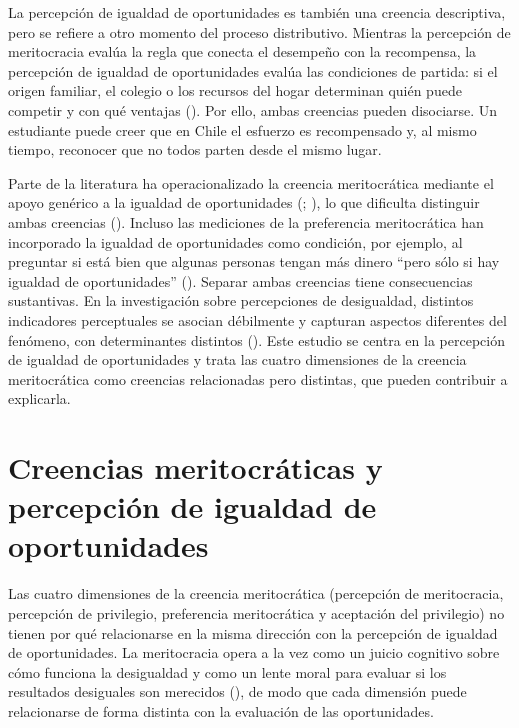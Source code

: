 \documentclass[
  spanish,
  a4paper,
  oneside]{scrbook}
\begin{document}
La percepción de igualdad de oportunidades es también una creencia
descriptiva, pero se refiere a otro momento del proceso distributivo.
Mientras la percepción de meritocracia evalúa la regla que conecta el
desempeño con la recompensa, la percepción de igualdad de oportunidades
evalúa las condiciones de partida: si el origen familiar, el colegio o
los recursos del hogar determinan quién puede competir y con qué
ventajas (). Por ello, ambas
creencias pueden disociarse. Un estudiante puede creer que en Chile el
esfuerzo es recompensado y, al mismo tiempo, reconocer que no todos
parten desde el mismo lugar.

Parte de la literatura ha operacionalizado la creencia meritocrática
mediante el apoyo genérico a la igualdad de oportunidades
(;
), lo que dificulta
distinguir ambas creencias (). Incluso las mediciones de la preferencia meritocrática
han incorporado la igualdad de oportunidades como condición, por
ejemplo, al preguntar si está bien que algunas personas tengan más
dinero ``pero sólo si hay igualdad de oportunidades''
().
Separar ambas creencias tiene consecuencias sustantivas. En la
investigación sobre percepciones de desigualdad, distintos indicadores
perceptuales se asocian débilmente y capturan aspectos diferentes del
fenómeno, con determinantes distintos
(). Este
estudio se centra en la percepción de igualdad de oportunidades y trata
las cuatro dimensiones de la creencia meritocrática como creencias
relacionadas pero distintas, que pueden contribuir a explicarla.

\section{Creencias meritocráticas y percepción de igualdad de
oportunidades}\label{creencias-meritocruxe1ticas-y-percepciuxf3n-de-igualdad-de-oportunidades}

Las cuatro dimensiones de la creencia meritocrática (percepción de
meritocracia, percepción de privilegio, preferencia meritocrática y
aceptación del privilegio) no tienen por qué relacionarse en la misma
dirección con la percepción de igualdad de oportunidades. La
meritocracia opera a la vez como un juicio cognitivo sobre cómo funciona
la desigualdad y como un lente moral para evaluar si los resultados
desiguales son merecidos (), de modo que cada dimensión puede relacionarse de forma distinta
con la evaluación de las oportunidades.
\end{document}
